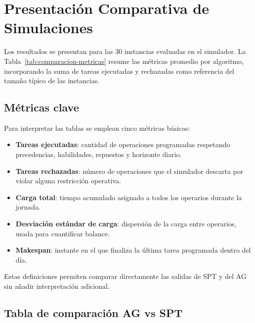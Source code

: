 \section{Presentación Comparativa de Simulaciones}

Los resultados se presentan para las 30 instancias evaluadas en el simulador. La Tabla~\ref{tab:comparacion-metricas} resume las métricas promedio por algoritmo, incorporando la suma de tareas ejecutadas y rechazadas como referencia del tamaño típico de las instancias.

\subsection{Métricas clave}

Para interpretar las tablas se emplean cinco métricas básicas:
\begin{itemize}
    \item \textbf{Tareas ejecutadas}: cantidad de operaciones programadas respetando precedencias, habilidades, repuestos y horizonte diario.
    \item \textbf{Tareas rechazadas}: número de operaciones que el simulador descarta por violar alguna restricción operativa.
    \item \textbf{Carga total}: tiempo acumulado asignado a todos los operarios durante la jornada.
    \item \textbf{Desviación estándar de carga}: dispersión de la carga entre operarios, usada para cuantificar balance.
    \item \textbf{Makespan}: instante en el que finaliza la última tarea programada dentro del día.
\end{itemize}
Estas definiciones permiten comparar directamente las salidas de SPT y del AG sin añadir interpretación adicional.


\subsection{Tabla de comparación AG vs SPT}

\begin{table}[H]
\centering
\small
\caption{Resumen comparativo de métricas (promedio en 30 instancias).}
\label{tab:comparacion-metricas}
\end{table}

